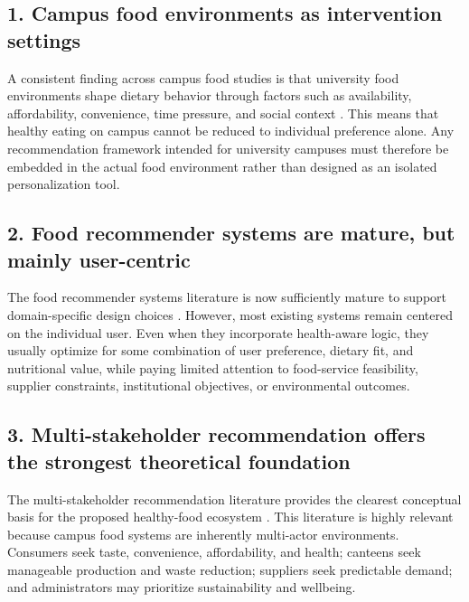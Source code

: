 \subsection{1. Campus food environments as intervention
settings}\label{campus-food-environments-as-intervention-settings}

A consistent finding across campus food studies is that university food
environments shape dietary behavior through factors such as
availability, affordability, convenience, time pressure, and social
context
\citep{roy2015tertiary, deliens2014determinants, caruso2025campus}. This
means that healthy eating on campus cannot be reduced to individual
preference alone. Any recommendation framework intended for university
campuses must therefore be embedded in the actual food environment
rather than designed as an isolated personalization tool.

\subsection{2. Food recommender systems are mature, but mainly
user-centric}\label{food-recommender-systems-are-mature-but-mainly-user-centric}

The food recommender systems literature is now sufficiently mature to
support domain-specific design choices
\citep{bondevik2024, tran2018healthy, trattner2017food}. However, most
existing systems remain centered on the individual user. Even when they
incorporate health-aware logic, they usually optimize for some
combination of user preference, dietary fit, and nutritional value,
while paying limited attention to food-service feasibility, supplier
constraints, institutional objectives, or environmental outcomes.

\subsection{3. Multi-stakeholder recommendation offers the strongest
theoretical
foundation}\label{multi-stakeholder-recommendation-offers-the-strongest-theoretical-foundation}

The multi-stakeholder recommendation literature provides the clearest
conceptual basis for the proposed healthy-food ecosystem
\citep{zheng2017msr, abdollahpouri2019fairness, wu2021multifr}. This
literature is highly relevant because campus food systems are inherently
multi-actor environments. Consumers seek taste, convenience,
affordability, and health; canteens seek manageable production and waste
reduction; suppliers seek predictable demand; and administrators may
prioritize sustainability and wellbeing.

